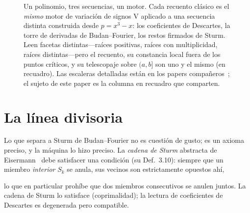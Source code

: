 \documentclass[11pt]{article}
\newcommand{\V}{\mathrm{V}}
\newcommand{\keyeq}[1]{\begin{center}\keybox{$\displaystyle #1$}\end{center}}
\begin{document}
\begin{figure}[htbp]
\centering
{}
\caption{Un polinomio, tres secuencias, un motor. Cada recuento cl\'asico es el \emph{mismo} motor de
variaci\'on de signos $\V$ aplicado a una secuencia distinta construida desde $p=x^3-x$: los coeficientes de
Descartes, la torre de derivadas de Budan--Fourier, los restos firmados de Sturm. Leen facetas
distintas---ra\'ices positivas, ra\'ices con multiplicidad, ra\'ices distintas---pero el recuento, su
constancia local fuera de los puntos cr\'iticos, y su telescopaje sobre $(a,b]$ son uno y el mismo (en
recuadro). Las escaleras detalladas est\'an en los papers compa\~neros~\cite{sturmlean,budanlean}; el sujeto
de este paper es la columna en recuadro que comparten.}
\label{fig:compare}
\end{figure}

\section{La l\'inea divisoria}\label{sec:divide}

Lo que separa a Sturm de Budan--Fourier no es cuesti\'on de gusto; es un axioma preciso, y la m\'aquina lo
hizo preciso. La \emph{cadena de Sturm} abstracta de Eisermann~\cite{eisermann} debe satisfacer una
condici\'on (su Def.~3.10): siempre que un miembro \emph{interior} $S_k$ se anula, sus vecinos son
estrictamente opuestos ah\'i,
\keyeq{S_k(c)=0\ \Longrightarrow\ S_{k-1}(c)\,S_{k+1}(c)<0\qquad(0<k<n),}
lo que en particular proh\'ibe que dos miembros consecutivos se anulen juntos. La cadena de Sturm lo
satisface (coprimalidad); la lectura de coeficientes de Descartes es degenerada pero compatible.
\end{document}
